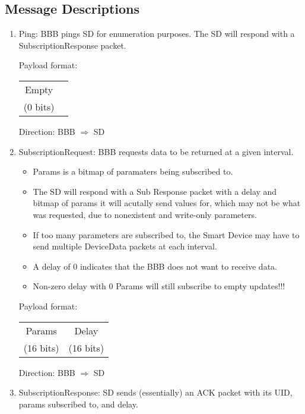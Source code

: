 \documentclass[12pt]{book}
\begin{document}
\subsection{Message Descriptions}
\begin{enumerate}
    \item Ping: BBB pings SD for enumeration purposes.
        The SD will respond with a SubscriptionResponse packet.
        
        Payload format:
        \begin{center}
            \begin{tabular}{|c|c|}
                \hline
                Empty \\
                (0 bits) \\
                \hline
            \end{tabular}
        \end{center}
        Direction: BBB $\Rightarrow$ SD

    \item SubscriptionRequest: BBB requests data to be returned at a given interval.
        \begin{itemize}
            \item Params is a bitmap of paramaters being subscribed to.
            \item The SD will respond with a Sub Response packet with a delay and
                bitmap of params it will acutally send values for, which may not be
                what was requested, due to nonexistent and write-only parameters.
            \item If too many parameters are subscribed to, the Smart Device may have
                to send multiple DeviceData packets at each interval.
            \item A delay of 0 indicates that the BBB does not want to receive data.
            \item Non-zero delay with 0 Params will still subscribe to empty
                updates!!!
        \end{itemize}
        Payload format:
        \begin{center}
            \begin{tabular}{|c|c|}
                \hline
                Params & Delay \\
                (16 bits) & (16 bits) \\
                \hline
            \end{tabular}
        \end{center}
        Direction: BBB $\Rightarrow$ SD
    \item SubscriptionResponse: SD sends (essentially) an ACK packet with its UID,
        params subscribed to, and delay.


\end{enumerate}
\end{document}

